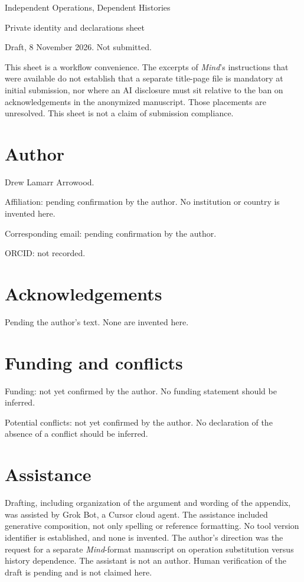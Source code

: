 \documentclass[12pt]{article}
\begin{document}
\begin{center}
{\Large Independent Operations, Dependent Histories\par}
\vspace{1em}
{\large Private identity and declarations sheet\par}
\vspace{0.4em}
Draft, 8 November 2026. Not submitted.\par
\end{center}

This sheet is a workflow convenience. The excerpts of \emph{Mind}'s instructions that were available do not establish that a separate title-page file is mandatory at initial submission, nor where an AI disclosure must sit relative to the ban on acknowledgements in the anonymized manuscript. Those placements are unresolved. This sheet is not a claim of submission compliance.

\section*{Author}
Drew Lamarr Arrowood.

Affiliation: pending confirmation by the author. No institution or country is invented here.

Corresponding email: pending confirmation by the author.

ORCID: not recorded.

\section*{Acknowledgements}
Pending the author's text. None are invented here.

\section*{Funding and conflicts}
Funding: not yet confirmed by the author. No funding statement should be inferred.

Potential conflicts: not yet confirmed by the author. No declaration of the absence of a conflict should be inferred.

\section*{Assistance}
Drafting, including organization of the argument and wording of the appendix, was assisted by Grok Bot, a Cursor cloud agent. The assistance included generative composition, not only spelling or reference formatting. No tool version identifier is established, and none is invented. The author's direction was the request for a separate \emph{Mind}-format manuscript on operation substitution versus history dependence. The assistant is not an author. Human verification of the draft is pending and is not claimed here.
\end{document}
